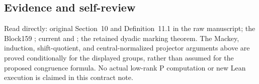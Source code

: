 \hypertarget{lowrank_contract-evidence-and-self-review}{%
\subsection{Evidence and self-review}\label{lowrank_contract-evidence-and-self-review}}

Read directly: original Section~10 and Definition~11.1 in the raw
manuscript; the Block159 ;
current  and ; the retained dyadic marking
theorem. The Mackey, induction, shift-quotient, and central-normalized
projector arguments above are proved conditionally for the displayed
groups, rather than assumed for the proposed congruence formula. No
actual low-rank P computation or new Lean execution is claimed in this
contract note.
